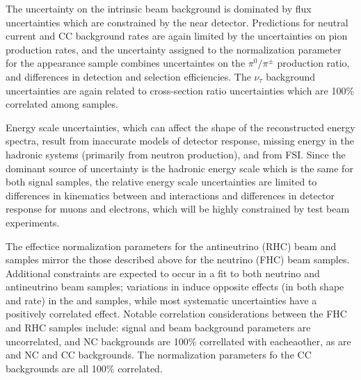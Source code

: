 The uncertainty on the intrinsic
beam \nue background is dominated by flux uncertainties which are constrained by the near detector.
Predictions for neutral current and \numu CC background rates are again limited by the uncertainties on pion
production rates, and the uncertainty assigned to the normalization parameter for the \nue appearance sample combines uncertaintes
on the $\pi^{0}/\pi^{\pm}$ production ratio, and differences in detection and selection efficiencies.
The $\nu_{\tau}$ background uncertainties are again related to cross-section ratio uncertainties
which are 100\% correlated among samples.

Energy scale uncertainties, which can affect the shape of the reconstructed energy spectra, result from
inaccurate models of detector response, missing energy in the hadronic systems (primarily from neutron production),
and from FSI. Since the dominant source of uncertainty is the hadronic energy scale which is the same for both
signal samples, the relative energy scale uncertainties are limited to differences in kinematics
between \numu and \nue interactions and differences in detector response for muons and electrons,
which will be highly constrained by test beam experiments.

The effectice normalization parameters for the antineutrino (RHC) beam \nue and \numu samples mirror the
those described above for the neutrino (FHC) beam samples.
Additional constraints are expected to occur in a fit to both neutrino and antineutrino beam samples;
variations in \deltacp induce opposite effects (in both shape and rate) in the \nue and \anue samples,
while most systematic uncertainties have a positively correlated effect. Notable correlation considerations between
the FHC and RHC samples include: signal and beam \nue background parameters are uncorrelated, 
\numu and \anumu NC backgrounds are 100\% correllated with eacheaother, as are \nue and \anue
NC and \numu CC backgrounds. The normalization parameters fo the \nutau CC backgrounds are all 100\% correlated.


